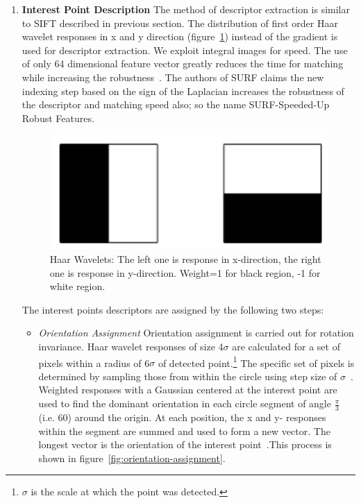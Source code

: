 \begin{enumerate}
\item \textbf{Interest Point Description} The method of descriptor extraction is similar to SIFT described in previous section. The distribution of first order Haar wavelet responses in x and y direction (figure~\ref{fig:haar-wavelets}) instead of the gradient is used for descriptor extraction. We exploit integral images for speed. The use of only 64 dimensional feature vector greatly reduces the time for matching while increasing the robustness~\cite{Bay:08}. The authors of SURF claims the new indexing step based on the sign of the Laplacian increases the robustness of the descriptor and matching speed also; so the name SURF-Speeded-Up Robust Features.\\

\begin{figure}[H]%
\centering
\includegraphics[width=\columnwidth]{2.mainmatter/2.Methodology/FeaturesExtraction/figures/SURF/haar-wavelets}%
\caption[Haar Wavelets]{Haar Wavelets: The left one is response in x-direction, the right one is response in y-direction. Weight=1 for black region, -1 for white region. }%
\label{fig:haar-wavelets}%
\end{figure}


The interest points descriptors are assigned by the following two steps:
\begin{itemize}
	\item {\textit{Orientation Assignment}} Orientation assignment is carried out for rotation invariance. Haar wavelet responses of size 4$\sigma$ are calculated for a set of pixels within a radius of 6$\sigma$ of detected point.\footnote{$\sigma$ is the scale at which the point was detected.} The specific set of pixels is determined by sampling those from within the circle using step size of $\sigma$~\cite{Evans:09}. Weighted responses with a Gaussian centered at the interest point are used to find the dominant orientation in each circle segment of angle $\frac{\pi}{3}$ (i.e. 60\deg) around the origin. At each position, the x and y- responses within the segment are summed and used to form a new vector. The longest vector is the orientation of the interest point~\cite{Evans:09}.This process is shown in figure~\ref{fig:orientation-assignment}.
	

\end{itemize}
\end{enumerate}
